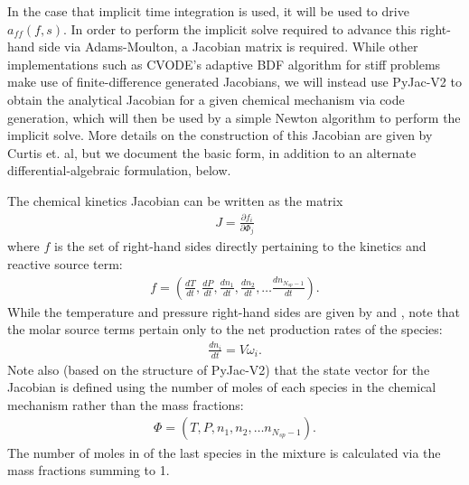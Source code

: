 In the case that implicit time integration is used, it will be used
to drive $a_{ff}(f,s)$. In order to perform the implicit solve required
to advance this right-hand side via Adams-Moulton, a Jacobian matrix
is required. While other implementations such as CVODE's adaptive BDF
algorithm for stiff problems make use of finite-difference generated
Jacobians, we will instead use PyJac-V2 \cite{curtis2018using} to obtain the analytical Jacobian
for a given chemical mechanism via code generation, which will then
be used by a simple Newton algorithm to perform the implicit solve. More
details on the construction of this Jacobian are given by Curtis et. al, but we
document the basic form, in addition to an alternate differential-algebraic
formulation, below.

The chemical kinetics Jacobian can be written as the matrix
\begin{align}
J = \frac{\partial f_{i}}{\partial \Phi_{j}} \label{eq:jac}
\end{align}
where $f$ is the set of right-hand sides directly pertaining
to the kinetics and reactive source term:
\begin{align}
f = \left(\frac{dT}{dt}, \frac{dP}{dt}, \frac{dn_{1}}{dt}, \frac{dn_{2}}{dt}, \hdots \frac{dn_{N_{sp}-1}}{dt} \right).
\end{align}
While the temperature and pressure right-hand sides are given by  and ,
note that the molar source terms pertain only to the net production rates of the species:
\begin{align}
\frac{dn_{i}}{dt} = V \dot{\omega}_{i}.
\end{align}
Note also (based on the structure of PyJac-V2) that the state vector for the
Jacobian is defined using the number of moles of each species in the chemical
mechanism rather than the mass fractions:
\begin{align}
\Phi = \left(T, P, n_{1}, n_{2}, \hdots n_{N_{sp}-1}\right).
\end{align}
The number of moles in of the last species in the mixture is calculated
via the mass fractions summing to 1.

